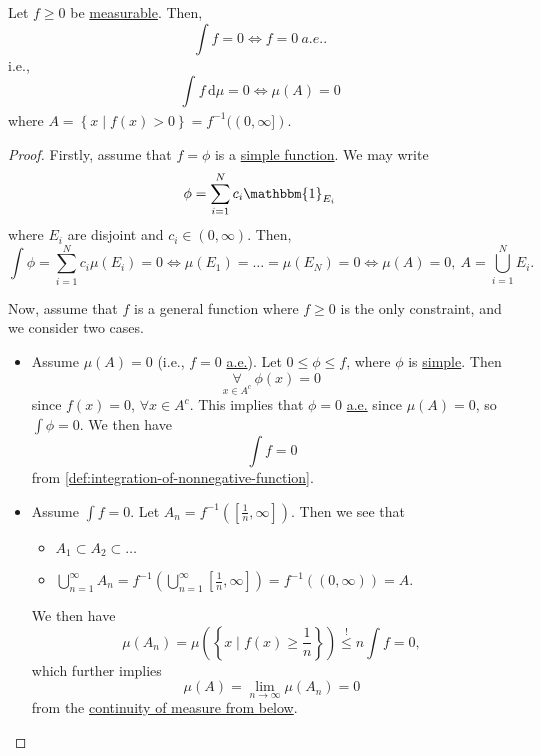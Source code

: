 \begin{proposition}\label{prop:lec12-1}
	Let \(f\geq 0\) be \hyperref[def:measurable-function]{measurable}. Then,
	\[
		\int f = 0 \iff f = 0\ \hyperref[def:mu-almost-everywhere]{a.e.}.
	\]
	i.e.,
	\[
		\int_{}^{} f \,\mathrm{d}\mu = 0 \iff \mu (A) = 0
	\]
	where \(A = \left\{x \mid f(x)>0\right\} = f^{-1} ((0, \infty ])\).
\end{proposition}
\begin{proof}
	Firstly, assume that \(f = \phi \) is a \hyperref[def:simple-function]{simple function}. We may write
	\[
		\phi = \sum_{i=1}^{N} c_{i}\mathbbm{1}_{E_{i}}
	\]
	where \(E_{i}\) are disjoint and \(c_{i}\in(0, \infty )\). Then,
	\[
		\int \phi = \sum_{i=1}^{N} c_{i}\mu (E_{i}) = 0
		\iff \mu (E_1) = \dots = \mu (E_{N}) = 0
		\iff \mu (A) = 0,\ A = \bigcup_{i=1}^{N} E_{i}.
	\]

	Now, assume that \(f\) is a general function where \(f\geq 0\) is the only constraint, and we consider two cases.
	\begin{itemize}
		\item Assume \(\mu (A) = 0\) (i.e., \(f = 0\) \hyperref[def:mu-almost-everywhere]{a.e.}). Let \(0\leq \phi \leq f\), where \(\phi\) is \hyperref[def:simple-function]{simple}. Then
		      \[
			      \underset{x\in A^{c} }{\forall }\ \phi (x) = 0
		      \]
		      since \(f(x) = 0\), \(\forall x\in A^{c} \). This implies that \(\phi = 0\) \hyperref[def:mu-almost-everywhere]{a.e.} since \(\mu (A) = 0\), so \(\int \phi =0\). We then have
		      \[
			      \int f = 0
		      \]
		      from \autoref{def:integration-of-nonnegative-function}.
		\item Assume \(\int f = 0\). Let \(A_{n} = f^{-1} \left(\left[\frac{1}{n}, \infty \right]\right)\). Then we see that
		      \begin{itemize}
			      \item \(A_1\subset A_2\subset \dots  \)
			      \item \(\bigcup_{n=1}^{\infty} A_{n} = f^{-1} \left(\bigcup_{n=1}^{\infty} \left[\frac{1}{n}, \infty \right]\right) = f^{-1} ((0, \infty )) = A\).
		      \end{itemize}
		      We then have
		      \[
			      \mu (A_{n}) = \mu \left(\left\{x \mid f(x)\geq \frac{1}{n}\right\}\right) \overset{\hyperref[lma:Markov-inequality]{!}}{\leq }n \int f = 0,
		      \]
		      which further implies
		      \[
			      \mu (A) = \lim_{n \to \infty} \mu (A_{n}) = 0
		      \]
		      from the \hyperref[thm:measure-space-continuity-from-below]{continuity of measure from below}.
	\end{itemize}
\end{proof}

